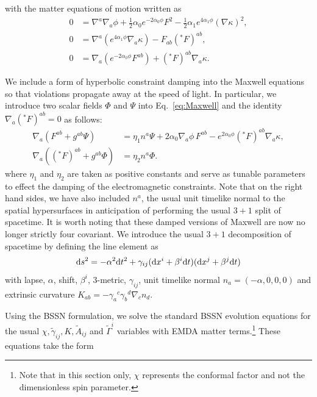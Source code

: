 with the matter equations of motion written as 
\begin{align}
0
&=
\nabla^a\nabla_a\phi
+
\frac{1}{2}\alpha_0 e^{-2\alpha_0\phi}F^2
-
\frac{1}{2}\alpha_1 e^{4\alpha_1\phi}(\nabla\kappa)^2,
\label{eq:phi}
\\[1ex]
0
&=
\nabla^a\left(e^{4\alpha_1\phi}\nabla_a\kappa\right)
-
F_{ab}({}^*F)^{ab},
\label{eq:kappa}
\\[1ex]
0
&=
\nabla_a\left(e^{-2\alpha_0\phi}F^{ab}\right)
+
({}^*F)^{ab}\nabla_a\kappa.
\label{eq:Maxwell}
\end{align}

We include a form of hyperbolic constraint damping into the Maxwell equations so that violations propagate away at the speed of light. In particular, we introduce two scalar fields $\Phi$ and $\Psi$ into Eq.~\eqref{eq:Maxwell} and the identity $\nabla_a({}^*F)^{ab}=0$ as follows:
\begin{align}
\nabla_a\left(F^{ab}+g^{ab}\Psi\right)
&=
\eta_1 n^a\Psi
+
2\alpha_0\nabla_a\phi\,F^{ab}
-
e^{2\alpha_0\phi}({}^*F)^{ab}\nabla_a\kappa,
\\[1ex]
\nabla_a\left(({}^*F)^{ab}+g^{ab}\Phi\right)
&=
\eta_2 n^a\Phi.
\end{align}
where $\eta_1$ and $\eta_2$ are taken as positive constants and serve as tunable parameters to effect the damping of the electromagnetic constraints. Note that on the right hand sides, we have also included $n^a$, the usual unit timelike normal to the spatial hypersurfaces in anticipation of performing the usual $3+1$ split of spacetime. It is worth noting that these damped versions of Maxwell are now no longer strictly four covariant.
We introduce the usual $3+1$ decomposition of spacetime by defining the line element as 
\begin{align}
{\rm d}s^2 = -\alpha^2 {\rm d} t^2 + \gamma_{ij} ({\rm d}x^i + \beta^i {\rm d}t) ({\rm d}x^j + \beta^j {\rm d}t) 
\end{align}
with lapse, $\alpha$, shift, $\beta^i$, 3-metric, $\gamma_{ij}$, unit timelike normal $n_a = (-\alpha,0,0,0)$ and extrinsic curvature $K_{ab} = - \gamma_a{}^c \gamma_b{}^d\nabla_c n_d$.  

Using the BSSN formulation, we solve the standard 
BSSN evolution equations for the usual $\chi, {\tilde \gamma}_{ij}, K, {\tilde A}_{ij}$ and ${\tilde \Gamma}^i$ variables with EMDA matter terms.\footnote{Note that in this section only, $\chi$ represents the conformal factor and not the dimensionless spin parameter.}  These equations take the form 

